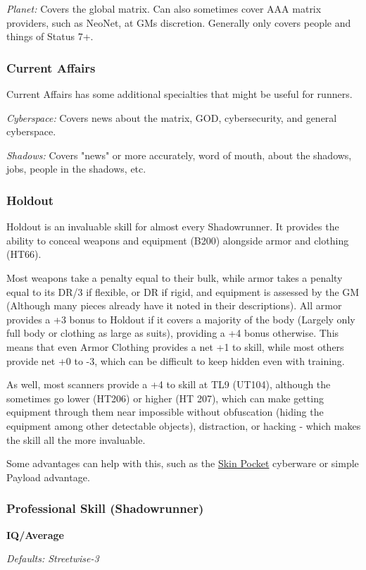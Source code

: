 \begin{multicols}{3}
	\textit{Planet:} Covers the global matrix. Can also sometimes cover AAA matrix providers, such as NeoNet, at GMs discretion. Generally only covers people and things of Status 7+.
	
	\subsubsection*{Current Affairs}
	
	Current Affairs has some additional specialties that might be useful for runners.
	
	\textit{Cyberspace:} Covers news about the matrix, GOD, cybersecurity, and general cyberspace.
	
	\textit{Shadows:} Covers "news" or more accurately, word of mouth, about the shadows, jobs, people in the shadows, etc.
	
	\subsubsection*{Holdout}\label{holdout}
	Holdout is an invaluable skill for almost every Shadowrunner. It provides the ability to conceal weapons and equipment (B200) alongside armor and clothing (HT66). 
	
	Most weapons take a penalty equal to their bulk, while armor takes a penalty equal to its DR/3 if flexible, or DR if rigid, and equipment is assessed by the GM (Although many pieces already have it noted in their descriptions). All armor provides a +3 bonus to Holdout if it covers a majority of the body (Largely only full body or clothing as large as suits), providing a +4 bonus otherwise. This means that even Armor Clothing provides a net +1 to skill, while most others provide net +0 to -3, which can be difficult to keep hidden even with training.
	
	As well, most scanners provide a +4 to skill at TL9 (UT104), although the sometimes go lower (HT206) or higher (HT 207), which can make getting equipment through them near impossible without obfuscation (hiding the equipment among other detectable objects), distraction, or hacking - which makes the skill all the more invaluable.
	
	Some advantages can help with this, such as the \hyperref[skin_pocket]{Skin Pocket} cyberware or simple Payload advantage.	
	
	\subsubsection*{Professional Skill (Shadowrunner)}
	\begin{flushright}
		\textbf{IQ/Average}
	\end{flushright}
	\textit{\textcolor{NavyBlue}{Defaults: Streetwise-3}}
	

\end{multicols}
